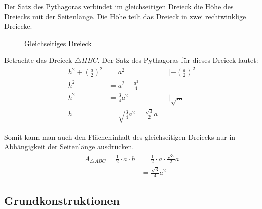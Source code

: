 \begin{folg}
 Der Satz des Pythagoras verbindet im gleichseitigen Dreieck die Höhe des Dreiecks mit der Seitenlänge. Die Höhe teilt das Dreieck in zwei rechtwinklige Dreiecke.
 
  \begin{figure}
  \begin{center}
  \end{center}
  \caption{Gleichseitiges Dreieck}
 \end{figure}
 
 Betrachte das Dreieck \(\triangle HBC\). Der Satz des Pythagoras für dieses Dreieck lautet:
 \begin{align*}
  h^2 + \left(\frac{a}{2}\right)^2 &= a^2 && |- \left(\frac{a}{2}\right)^2 \\
  h^2 &= a^2 - \frac{a^2}{4} \\
  h^2 &= \frac{3}{4} a^2 &&| \sqrt{\ldots} \\
  h &= \sqrt{\frac{3}{4} a^2} = \frac{\sqrt{3}}{2}a
 \end{align*}
 
 Somit kann man auch den Flächeninhalt des gleichseitigen Dreiecks nur in Abhängigkeit der Seitenlänge ausdrücken.
 \begin{align*}
  A_{\triangle ABC} = \frac{1}{2} \cdot a\cdot h &= \frac{1}{2} \cdot a \cdot \frac{\sqrt{3}}{2}a \\
  &= \frac{\sqrt{3}}{4}a^2
 \end{align*}

\end{folg}


\subsection{Grundkonstruktionen}


